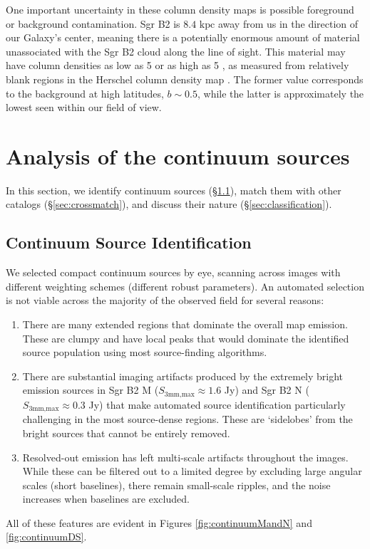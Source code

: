 \documentclass[twocolumn]{aastex61}
\newcommand{\dsgrb}{\ensuremath{8.4\textrm{~kpc}}\xspace}
\begin{document}
One important uncertainty in these column density maps is possible foreground
or background contamination.  Sgr B2 is \dsgrb away from us in the direction of
our Galaxy's center, meaning there is a potentially enormous amount of material
unassociated with the Sgr B2 cloud along the line of sight.  This material may
have column densities as low as 5 \persc or as high as 5 \persc,
as measured from relatively blank regions in the Herschel column density map
\citep[][and in prep]{Battersby2011a}.  The former value corresponds to the
background at high latitudes, $b\sim0.5$, while the latter  is approximately
the lowest seen within our field of view. 

\section{Analysis of the continuum sources}
\label{sec:analysis}
In this section, we identify continuum sources (\S \ref{sec:contsources}),
match them with other catalogs (\S \ref{sec:crossmatch}), and discuss
their nature (\S \ref{sec:classification}).

\subsection{Continuum Source Identification}
\label{sec:contsources}
We selected compact continuum  sources by eye,
scanning across images with different weighting schemes (different robust
parameters).  An automated selection is not viable across the majority of the
observed field for several reasons:
\begin{enumerate}
    \item There are many extended \hii regions that dominate the overall map
        emission.  These are clumpy and have local peaks that would dominate
        the identified source population using most source-finding algorithms.
    \item There are substantial imaging artifacts produced by the extremely
        bright emission sources in Sgr B2 M ($S_{3 \textrm{mm,max}} \approx 1.6$ Jy) and
        Sgr B2 N ($S_{3 \textrm{mm,max}} \approx 0.3$ Jy) that make automated source
        identification particularly challenging in the most source-dense
        regions.  These are `sidelobes' from the bright sources that cannot be
        entirely removed.
    \item Resolved-out emission has left multi-scale artifacts throughout the
        images.  While these can be filtered out to a limited degree by
        excluding large angular scales (short baselines), there remain
        small-scale ripples, and the noise increases when baselines are
        excluded.
\end{enumerate}
All of these features are evident in Figures \ref{fig:continuumMandN} and
\ref{fig:continuumDS}. 
\end{document}
